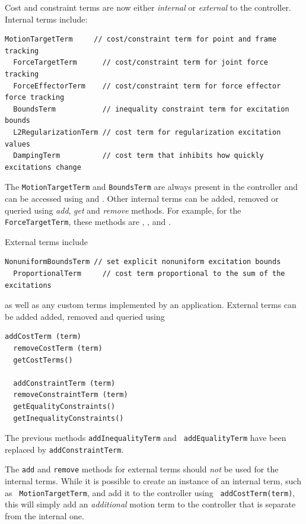 \documentclass{article}
\begin{document}
Cost and constraint terms are now either {\it internal} or {\it
external} to the controller. Internal terms include:
%
\begin{lstlisting}[]
  MotionTargetTerm     // cost/constraint term for point and frame tracking
  ForceTargetTerm      // cost/constraint term for joint force tracking
  ForceEffectorTerm    // cost/constraint term for force effector force tracking
  BoundsTerm           // inequality constraint term for excitation bounds
  L2RegularizationTerm // cost term for regularization excitation values
  DampingTerm          // cost term that inhibits how quickly excitations change
\end{lstlisting}
%
The {\tt MotionTargetTerm} and {\tt BoundsTerm} are always present in
the controller and can be accessed using
and
.
Other internal terms can be added, removed or queried using {\it add},
{\it get} and {\it remove} methods. For example, for the 
{\tt ForceTargetTerm}, these methods are 
,
,
and
.

External terms include
\begin{lstlisting}[]
  NonuniformBoundsTerm // set explicit nonuniform excitation bounds
  ProportionalTerm     // cost term proportional to the sum of the excitations
\end{lstlisting}
%
as well as any custom terms implemented by an application. External
terms can be added added, removed and queried using
%
\begin{lstlisting}[]
  addCostTerm (term)
  removeCostTerm (term)
  getCostTerms()

  addConstraintTerm (term)
  removeConstraintTerm (term)
  getEqualityConstraints()
  getInequalityConstraints()
\end{lstlisting}
%

\begin{sideblock}
The previous methods {\tt addInequalityTerm} and {\tt
addEqualityTerm} have been replaced by {\tt addConstraintTerm}.
\end{sideblock}

\begin{sideblock}
The {\tt add} and {\tt remove} methods for external
terms should {\it not} be used for the internal terms. While it is
possible to create an instance of an internal term, such as {\tt
MotionTargetTerm}, and add it to the controller using {\tt
addCostTerm(term)}, this will simply add an {\it additional} motion
term to the controller that is separate from the internal one.
\end{sideblock}
\end{document}
